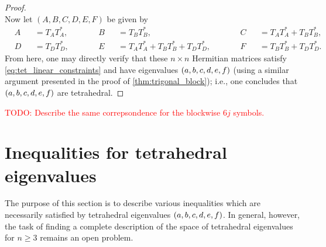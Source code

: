 \documentclass[notitlepage, 10pt]{article}
\begin{document}
\begin{proof}
\begin{equation}
    \end{equation}
    Now let $(A,B,C,D,E,F)$ be given by
    \begin{equation}
        \begin{alignedat}{6}
            &A &&= T_{A}T_{A}^{*}, \qquad
            &&B &&= T_{B}T_{B}^{*}, \qquad
            &&C &&= T_{A}T_{A}^{*} + T_{B}T_{B}^{*}, \\
            &D &&= T_{D}T_{D}^{*}, \qquad
            &&E &&= T_{A}T_{A}^{*} + T_{B}T_{B}^{*} + T_{D}T_{D}^{*}, \qquad
            &&F &&= T_{B}T_{B}^{*} + T_{D}T_{D}^{*}.
        \end{alignedat}
    \end{equation}
    From here, one may directly verify that these $n\times n$ Hermitian matrices satisfy \cref{eq:tet_linear_constraints}
    and have eigenvalues $(a,b,c,d,e,f)$ (using a similar argument presented in the proof of \cref{thm:trigonal_block}); i.e., one concludes that $(a,b,c,d,e,f)$ are tetrahedral.
\end{proof}

\textcolor{red}{TODO: Describe the same correpsondence for the blockwise $6j$ symbols.}


\section{Inequalities for tetrahedral eigenvalues}
\label{sec:ineqs}

The purpose of this section is to describe various inequalities which are necessarily satisfied by tetrahedral eigenvalues $(a,b,c,d,e,f)$.
In general, however, the task of finding a complete description of the space of tetrahedral eigenvalues for $n\geq 3$ remains an open problem.
\end{document}
